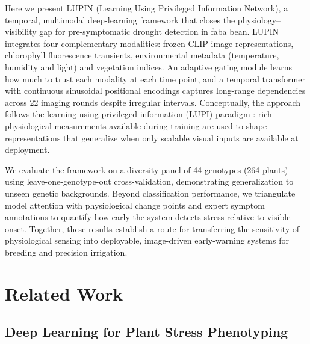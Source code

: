 \documentclass[a4paper,fleqn]{cas-dc}
\begin{document}
Here we present LUPIN (Learning Using Privileged Information Network), a temporal, multimodal deep-learning framework that closes the physiology--visibility gap for pre-symptomatic drought detection in faba bean. LUPIN integrates four complementary modalities: frozen CLIP image representations, chlorophyll fluorescence transients, environmental metadata (temperature, humidity and light) and vegetation indices. An adaptive gating module learns how much to trust each modality at each time point, and a temporal transformer with continuous sinusoidal positional encodings captures long-range dependencies across 22 imaging rounds despite irregular intervals. Conceptually, the approach follows the learning-using-privileged-information (LUPI) paradigm \citep{vapnikNewLearningParadigm2009}: rich physiological measurements available during training are used to shape representations that generalize when only scalable visual inputs are available at deployment.

We evaluate the framework on a diversity panel of 44 genotypes (264 plants) using leave-one-genotype-out cross-validation, demonstrating generalization to unseen genetic backgrounds. Beyond classification performance, we triangulate model attention with physiological change points and expert symptom annotations to quantify how early the system detects stress relative to visible onset. Together, these results establish a route for transferring the sensitivity of physiological sensing into deployable, image-driven early-warning systems for breeding and precision irrigation.


\section{Related Work}\label{sec:related}

\subsection{Deep Learning for Plant Stress Phenotyping}\label{sec:related:dl}
\end{document}
